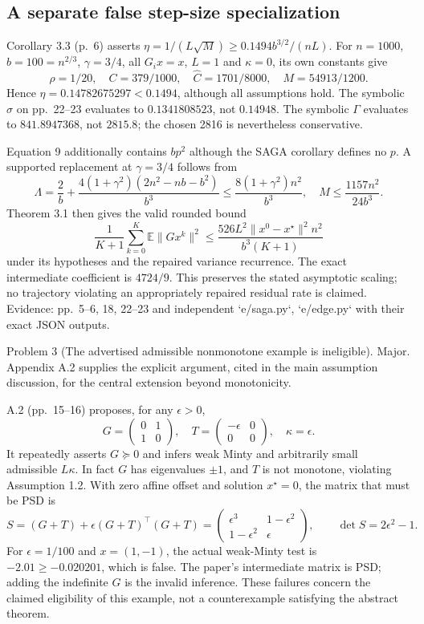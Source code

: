 \documentclass[10pt]{article}
\begin{document}
\subsection*{A separate false step-size specialization}
Corollary 3.3 (p. 6) asserts \(\eta=1/(L\sqrt M)\ge0.1494b^{3/2}/(nL)\). For \(n=1000\), \(b=100=n^{2/3}\), \(\gamma=3/4\), all \(G_ix=x\), \(L=1\) and \(\kappa=0\), its own constants give \[\rho=1/20,\quad C=379/1000,\quad
 \widehat C=1701/8000,\quad M=54913/1200.\] Hence \(\eta=0.14782675297<0.1494\), although all assumptions hold. The symbolic \(\sigma\) on pp. 22–23 evaluates to \(0.1341808523\), not \(0.14948\). The symbolic \(\Gamma\) evaluates to \(841.8947368\), not \(2815.8\); the chosen 2816 is nevertheless conservative.\par
Equation 9 additionally contains \(bp^2\) although the SAGA corollary defines no \(p\). A supported replacement at \(\gamma=3/4\) follows from \[\Lambda=\frac2b+\frac{4(1+\gamma^2)(2n^2-nb-b^2)}{b^3}
 \le\frac{8(1+\gamma^2)n^2}{b^3},
 \quad M\le\frac{1157n^2}{24b^3}.\] Theorem 3.1 then gives the valid rounded bound \[\frac1{K+1}\sum_{k=0}^K\mathbb E\|Gx^k\|^2
 \le\frac{526L^2\|x^0-x^\star\|^2n^2}{b^3(K+1)}\] under its hypotheses and the repaired variance recurrence. The exact intermediate coefficient is \(4724/9\). This preserves the stated asymptotic scaling; no trajectory violating an appropriately repaired residual rate is claimed. Evidence: pp. 5–6, 18, 22–23 and independent `e/saga.py`, `e/edge.py` with their exact JSON outputs.\par
Problem 3 (The advertised admissible nonmonotone example is ineligible).  Major. Appendix A.2 supplies the explicit argument, cited in the main assumption discussion, for the central extension beyond monotonicity.\par
A.2 (pp. 15–16) proposes, for any \(\epsilon>0\), \[G=\begin{pmatrix}0&1\\1&0\end{pmatrix},\quad
 T=\begin{pmatrix}-\epsilon&0\\0&0\end{pmatrix},\quad
 \kappa=\epsilon.\] It repeatedly asserts \(G\succeq0\) and infers weak Minty and arbitrarily small admissible \(L\kappa\). In fact \(G\) has eigenvalues \(\pm1\), and \(T\) is not monotone, violating Assumption 1.2. With zero affine offset and solution \(x^\star=0\), the matrix that must be PSD is \[S=(G+T)+\epsilon(G+T)^\top(G+T)
 =\begin{pmatrix}\epsilon^3&1-\epsilon^2\\1-\epsilon^2&\epsilon\end{pmatrix},
 \qquad \det S=2\epsilon^2-1.\] For \(\epsilon=1/100\) and \(x=(1,-1)\), the actual weak-Minty test is \(-2.01\ge-0.020201\), which is false. The paper’s intermediate matrix is PSD; adding the indefinite \(G\) is the invalid inference. These failures concern the claimed eligibility of this example, not a counterexample satisfying the abstract theorem.\par
\end{document}
